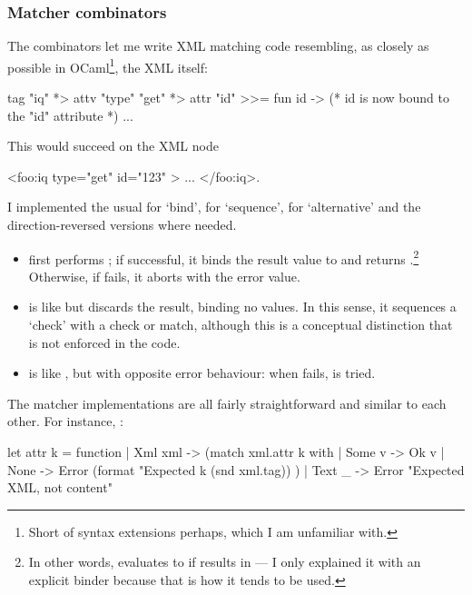 \documentclass[12pt,a4paper,twoside,openright]{report}
\begin{document}
{\subsubsection{Matcher combinators}
The combinators let me write XML matching code resembling, as closely as possible in OCaml\footnote{Short of syntax extensions perhaps, which I am unfamiliar with.}, the XML itself:

\begin{ocaml}
tag "iq" *> attv "type" "get" *> attr "id" >>= fun id ->
  (* id is now bound to the "id" attribute *)
  ...
\end{ocaml}

This would succeed on the XML node
\begin{xml}
<foo:iq type="get" id="123" > ... </foo:iq>.
\end{xml}

I implemented the usual \code{>>=} for `bind', \code{*>} for `sequence', \code{<|>} for `alternative' and the direction-reversed versions where needed.

\begin{itemize}
  \item {} first performs ; if successful, it binds the result value to  and returns .\footnote{In other words,  evaluates to  if  results in  --- I only explained it with an explicit binder because that is how it tends to be used.} Otherwise, if  fails, it aborts with the error value.

  \item {} is like \code{>>=} but discards the result, binding no values. In this sense, it sequences a `check' with a check or match, although this is a conceptual distinction that is not enforced in the code.

  \item {} is like \code{*>}, but with opposite error behaviour: when  fails,  is tried.
\end{itemize}

The matcher implementations are all fairly straightforward and similar to each other. For instance, :

\begin{ocaml}
let attr k = function
  | Xml xml -> (match xml.attr k with
    | Some v -> Ok v
    | None -> Error (format
        "Expected %
          k (snd xml.tag)) )
  | Text _ -> Error "Expected XML, not content"
\end{ocaml}

}
\end{document}
